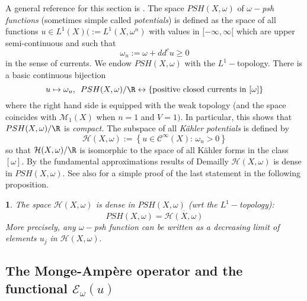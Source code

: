\documentclass[11pt,oneside,english]{amsart}
\numberwithin{equation}{section}
\numberwithin{figure}{section}
\theoremstyle{plain}
\theoremstyle{plain}
\theoremstyle{plain}
\theoremstyle{plain}
\newtheorem{prop}[thm]{\protect\propositionname}
\theoremstyle{remark}
\theoremstyle{definition}
\providecommand{\propositionname}{Proposition}
\begin{document}
A general reference for this section is \cite{g-z}. The space $PSH(X,\omega)$
of \emph{$\omega-$psh functions} (sometimes simple called \emph{potentials})
is defined as the space of all functions $u\in L^{1}(X)(:=L^{1}(X,\omega^{n})$
with values in $[-\infty,\infty[$ which are upper semi-continuous
and such that 
\[
\omega_{u}:=\omega+dd^{c}u\geq0
\]
 in the sense of currents. We endow $PSH(X,\omega)$ with the $L^{1}-$topology.
There is a basic continuous bijection \cite{g-z} 
\[
u\mapsto\omega_{u},\,\,\, PSH(X,\omega)/\R\leftrightarrow\left\{ \mbox{positive closed currents in \ensuremath{[\omega]}}\right\} 
\]
 where the right hand side is equipped with the weak topology (and
the space coincides with $\mathcal{M}_{1}(X)$ when $n=1$ and $V=1).$
In particular, this shows that $PSH(X,\omega)/\R$ is \emph{compact.
}The subspace of all \emph{Kähler potentials} is defined by 
\[
\mathcal{H}(X,\omega):=\left\{ u\in\mathcal{C^{\infty}}(X):\,\omega_{u}>0\right\} 
\]
 so that $\mathcal{H}(X,\omega)/\R$ is isomorphic to the space of
all Kähler forms in the class $\ensuremath{[\omega].}$ By the fundamental
approximations results of Demailly \cite{dem0} $\mathcal{H}(X,\omega)$
is dense in $PSH(X,\omega).$ See also \cite{bl-k} for a simple proof
of the last statement in the following proposition. 
\begin{prop}
\label{pro:(Demailly-ref).-The} The space $\mathcal{H}(X,\omega)$
is dense in $PSH(X,\omega)$ (wrt the $L^{1}-$topology): 
\[
PSH(X,\omega)=\overline{\mathcal{H}(X,\omega)}
\]
 More precisely, any $\omega-$psh function can be written as a decreasing
limit of elements $u_{j}$ in $\mathcal{H}(X,\omega).$ 
\end{prop}

\subsection{\label{sub:The-Monge-Amp=00003D0000E8re-operator}The Monge-Ampère
operator and the functional $\mathcal{E_{\omega}}(u)$}
\end{document}
